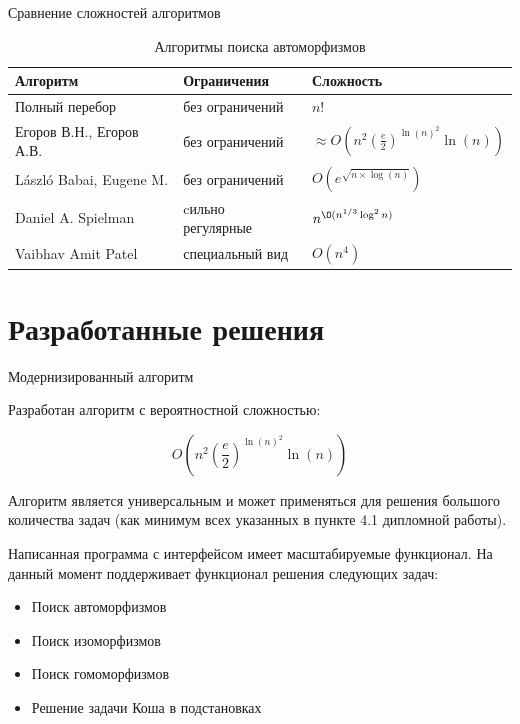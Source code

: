 \documentclass{beamer}
\begin{document}
\begin{frame}{Сравнение сложностей алгоритмов}

\begin{table}[h]
\centering
\small
\begin{tabular}[t]{|l|l|l|}
\hline
\textbf{Алгоритм} & \textbf{Ограничения} & \textbf{Сложность}\\
\hline
Полный перебор & без ограничений & $n!$\\
\hline
Егоров В.Н., Егоров А.В. & без ограничений & $\approx O(n^2(\frac{e}{2})^{\ln(n)^2} \ln(n))$\\
\hline
László Babai, Eugene M. & без ограничений & $O(e^{\sqrt{n \times \log(n)}})$\\
\hline
Daniel A. Spielman & cильно регулярные & $n^{\O({n^{1/3}\log^{2} n})}$\\
\hline
Vaibhav Amit Patel & специальный вид & $O(n^4)$\\
\hline
\end{tabular}
\caption{Алгоритмы поиска автоморфизмов}
\end{table}

\end{frame}


\section{Разработанные решения}

\begin{frame}{Модернизированный алгоритм}

Разработан алгоритм с вероятностной сложностью:

$$O(n^2(\frac{e}{2})^{\ln(n)^2} \ln(n))$$

Алгоритм является универсальным и может применяться для решения большого количества задач (как минимум всех указанных в пункте 4.1 дипломной работы).

Написанная программа с интерфейсом имеет масштабируемые функционал. На данный момент поддерживает функционал решения следующих задач:

\begin{itemize}
\item Поиск автоморфизмов
\item Поиск изоморфизмов
\item Поиск гомоморфизмов
\item Решение задачи Коша в подстановках
\end{itemize}

\end{frame}
\end{document}
